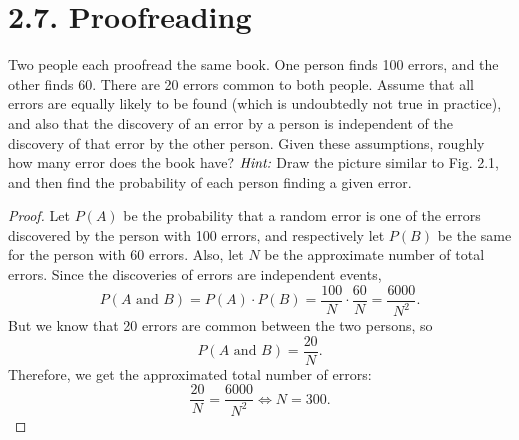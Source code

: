 \section*{2.7. Proofreading}
Two people each proofread the same book. One person finds 100 errors, and the other finds 60. 
There are 20 errors common to both people. Assume that all errors are equally likely to be found (which is 
undoubtedly not true in practice), and also that the discovery of an error by a person is independent
of the discovery of that error by the other person. Given these assumptions, roughly how many error 
does the book have? $\emph{Hint:}$ Draw the picture similar to Fig. 2.1, and then find the probability 
of each person finding a given error.

\vspace{2em}

\begin{proof}
    \hfill

    Let $P(A)$ be the probability that a random error is one of the errors discovered 
    by the person with 100 errors, and respectively let $P(B)$ be the same for the person with 60 errors.
    Also, let $N$ be the approximate number of total errors.
    Since the discoveries of errors are independent events, 
    \[
        P(A \text{ and } B) = P(A) \cdot P(B) = \frac{100}{N} \cdot \frac{60}{N} = \frac{6000}{N^2}
    .\] 
    But we know that 20 errors are common between the two persons, so
    \[
        P(A \text{ and } B) = \frac{20}{N}
    .\] 
    Therefore, we get the approximated total number of errors:
    \[
        \frac{20}{N} = \frac{6000}{N^2} \iff N = 300
    .\] 
\end{proof}
